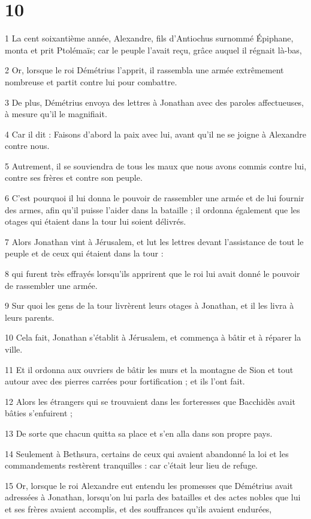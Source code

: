 \chapter{10}

\par 1 La cent soixantième année, Alexandre, fils d'Antiochus surnommé Épiphane, monta et prit Ptolémaïs; car le peuple l'avait reçu, grâce auquel il régnait là-bas,
\par 2 Or, lorsque le roi Démétrius l'apprit, il rassembla une armée extrêmement nombreuse et partit contre lui pour combattre.
\par 3 De plus, Démétrius envoya des lettres à Jonathan avec des paroles affectueuses, à mesure qu'il le magnifiait.
\par 4 Car il dit : Faisons d'abord la paix avec lui, avant qu'il ne se joigne à Alexandre contre nous.
\par 5 Autrement, il se souviendra de tous les maux que nous avons commis contre lui, contre ses frères et contre son peuple.
\par 6 C'est pourquoi il lui donna le pouvoir de rassembler une armée et de lui fournir des armes, afin qu'il puisse l'aider dans la bataille ; il ordonna également que les otages qui étaient dans la tour lui soient délivrés.
\par 7 Alors Jonathan vint à Jérusalem, et lut les lettres devant l'assistance de tout le peuple et de ceux qui étaient dans la tour :
\par 8 qui furent très effrayés lorsqu'ils apprirent que le roi lui avait donné le pouvoir de rassembler une armée.
\par 9 Sur quoi les gens de la tour livrèrent leurs otages à Jonathan, et il les livra à leurs parents.
\par 10 Cela fait, Jonathan s'établit à Jérusalem, et commença à bâtir et à réparer la ville.
\par 11 Et il ordonna aux ouvriers de bâtir les murs et la montagne de Sion et tout autour avec des pierres carrées pour fortification ; et ils l'ont fait.
\par 12 Alors les étrangers qui se trouvaient dans les forteresses que Bacchidès avait bâties s'enfuirent ;
\par 13 De sorte que chacun quitta sa place et s'en alla dans son propre pays.
\par 14 Seulement à Bethsura, certains de ceux qui avaient abandonné la loi et les commandements restèrent tranquilles : car c'était leur lieu de refuge.
\par 15 Or, lorsque le roi Alexandre eut entendu les promesses que Démétrius avait adressées à Jonathan, lorsqu'on lui parla des batailles et des actes nobles que lui et ses frères avaient accomplis, et des souffrances qu'ils avaient endurées,
